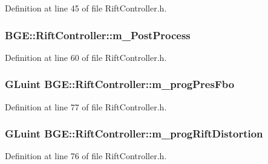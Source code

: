 Definition at line 45 of file Rift\-Controller.\-h.

\hypertarget{class_b_g_e_1_1_rift_controller_a275b202eee8521782b70d02144c81a6e}{
\subsubsection[{m\-\_\-\-Post\-Process}]{ B\-G\-E\-::\-Rift\-Controller\-::m\-\_\-\-Post\-Process}}\label{class_b_g_e_1_1_rift_controller_a275b202eee8521782b70d02144c81a6e}


Definition at line 60 of file Rift\-Controller.\-h.

\hypertarget{class_b_g_e_1_1_rift_controller_a8edafc61581313d7e1f3053bfe8c1561}{
\subsubsection[{m\-\_\-prog\-Pres\-Fbo}]{\setlength{\rightskip}{0pt plus 5cm}G\-Luint B\-G\-E\-::\-Rift\-Controller\-::m\-\_\-prog\-Pres\-Fbo}}\label{class_b_g_e_1_1_rift_controller_a8edafc61581313d7e1f3053bfe8c1561}


Definition at line 77 of file Rift\-Controller.\-h.

\hypertarget{class_b_g_e_1_1_rift_controller_ad621871816bc29c8f53b17a8f2aed74a}{
\subsubsection[{m\-\_\-prog\-Rift\-Distortion}]{\setlength{\rightskip}{0pt plus 5cm}G\-Luint B\-G\-E\-::\-Rift\-Controller\-::m\-\_\-prog\-Rift\-Distortion}}\label{class_b_g_e_1_1_rift_controller_ad621871816bc29c8f53b17a8f2aed74a}


Definition at line 76 of file Rift\-Controller.\-h.

